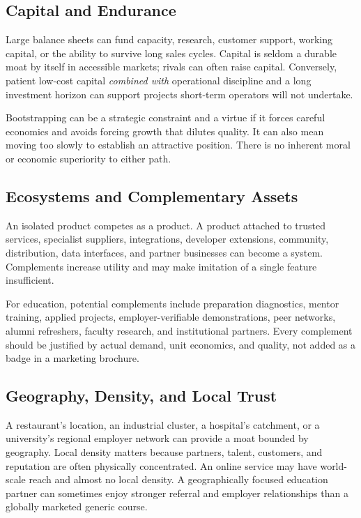 \subsection{Capital and Endurance}
\label{sec:capital_and_endurance}

Large balance sheets can fund capacity, research, customer support, working capital, or the ability to survive long sales cycles. Capital is seldom a durable moat by itself in accessible markets; rivals can often raise capital. Conversely, patient low-cost capital \textit{combined with} operational discipline and a long investment horizon can support projects short-term operators will not undertake.

Bootstrapping can be a strategic constraint and a virtue if it forces careful economics and avoids forcing growth that dilutes quality. It can also mean moving too slowly to establish an attractive position. There is no inherent moral or economic superiority to either path.

\subsection{Ecosystems and Complementary Assets}
\label{sec:ecosystems_complementary_assets}

An isolated product competes as a product. A product attached to trusted services, specialist suppliers, integrations, developer extensions, community, distribution, data interfaces, and partner businesses can become a system. Complements increase utility and may make imitation of a single feature insufficient.

For education, potential complements include preparation diagnostics, mentor training, applied projects, employer-verifiable demonstrations, peer networks, alumni refreshers, faculty research, and institutional partners. Every complement should be justified by actual demand, unit economics, and quality, not added as a badge in a marketing brochure.

\subsection{Geography, Density, and Local Trust}
\label{sec:geography_density_local_trust}

A restaurant's location, an industrial cluster, a hospital's catchment, or a university's regional employer network can provide a moat bounded by geography. Local density matters because partners, talent, customers, and reputation are often physically concentrated. An online service may have world-scale reach and almost no local density. A geographically focused education partner can sometimes enjoy stronger referral and employer relationships than a globally marketed generic course.

